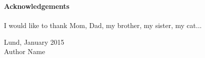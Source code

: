 \null\vfill

{\Huge \textbf{Acknowledgements}} \\ \\

I would like to thank Mom, Dad, my brother, my sister, my cat...

\vspace{1cm}

\begin{flushright}
Lund, January 2015\\Author Name
\end{flushright}

\vfill\vfill\vfill\vfill\null